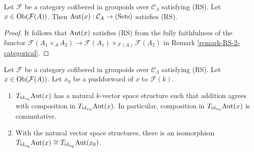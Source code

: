 \begin{lemma}
\label{lemma-Aut-functor-RS}
Let $\mathcal F$ be a category cofibered in groupoids over $\mathcal 
C_{\Lambda}$ satisfying \textnormal{(RS)}.  Let $x \in \textnormal{Ob}(\mathcal 
F(A))$.  Then $\textnormal{Aut}(x): \mathcal C_{A} \rightarrow 
\textnormal{(Sets)}$ satisfies \textnormal{(RS)}.
\end{lemma}

\begin{proof}
It follows that $\textnormal{Aut}(x)$ satisfies (RS) from the fully 
faithfulness of the functor $\mathcal F(A_1 \times_{A} A_2) \rightarrow 
\mathcal F(A_1) \times_{\mathcal F(A)} \mathcal F(A_2)$ in Remark 
\ref{remark-RS-2-categorical}.
\end{proof}

\begin{lemma}
\label{lemma-Aut-functor-tangent-space}
Let $\mathcal F$ be a category cofibered in groupoids over $\mathcal 
C_{\Lambda}$ satisfying \textnormal{(RS)}.  Let $x \in \textnormal{Ob}(\mathcal 
F(A))$.  Let $x_0$ be a pushforward of $x$ to $\mathcal F(k)$.
\begin{enumerate}
\item $T_{\textnormal{id}_{x_0}} \textnormal{Aut}(x)$ has a natural $k$-vector 
space structure such that addition agrees with composition in 
$T_{\textnormal{id}_{x_0}} \textnormal{Aut}(x)$.  In particular, composition in 
$T_{\textnormal{id}_{x_0}} \textnormal{Aut}(x)$ is commutative.
\item With the natural vector space structures, there is an isomorphism 
$T_{\textnormal{id}_{x_0}} \textnormal{Aut}(x) \cong T_{\textnormal{id}_{x_0}} 
\textnormal{Aut}(x_0)$.
\end{enumerate}
\end{lemma}

